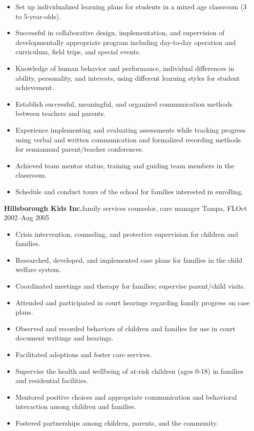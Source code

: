 \documentclass[letterpaper,10pt]{article}
\begin{document}
\begin{itemize}
    \item Set up individualized learning plans for students in a mixed age classroom (3 to 5-year-olds).
    \item Successful in collaborative design, implementation, and supervision of developmentally appropriate
    program including day-to-day operation and curriculum, field trips, and special events.
    \item Knowledge of human behavior and performance, individual differences in ability, personality, and
    interests, using different learning styles for student achievement.
    \item Establish successful, meaningful, and organized communication methods between teachers and parents.
    \item Experience implementing and evaluating assessments while tracking progress using verbal and
    written communication and formalized recording methods for semiannual parent/teacher conferences.
    \item Achieved team mentor status; training and guiding team members in the classroom.
    \item Schedule and conduct tours of the school for families interested in enrolling.
\end{itemize}

\vspace{1pc}
\textbf{Hillsborough Kids Inc.}\hfill family services counselor, care manager
\smallbreak Tampa, FL\hfill Oct 2002--Aug 2005

\begin{itemize}
    \item Crisis intervention, counseling, and protective supervision for children and families.
    \item Researched, developed, and implemented case plans for families in the child welfare system.
    \item Coordinated meetings and therapy for families; supervise parent/child visits.
    \item Attended and participated in court hearings regarding family progress on case plans.
    \item Observed and recorded behaviors of children and families for use in court document writings and hearings.
    \item Facilitated adoptions and foster care services.
    \item Supervise the health and wellbeing of at-risk children (ages 0-18) in families and residential facilities.
    \item Mentored positive choices and appropriate communication and behavioral interaction among children and families.
    \item Fostered partnerships among children, parents, and the community.
\end{itemize}
\end{document}
